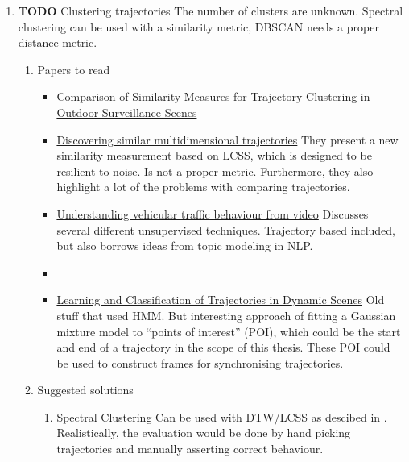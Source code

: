 \documentclass[11pt]{article}
\begin{document}
\begin{enumerate}
\item {\bfseries\sffamily TODO} Clustering trajectories
\label{sec:orgb6455f1}
The number of clusters are unknown. Spectral
clustering can be used with a similarity metric, DBSCAN needs a
proper distance metric.

\begin{enumerate}
\item Papers to read
\label{sec:org6747b9d}
\begin{itemize}
\item \href{https://ieeexplore.ieee.org/abstract/document/1699726}{Comparison of Similarity Measures for Trajectory Clustering in Outdoor Surveillance Scenes}

\item \href{https://ieeexplore.ieee.org/abstract/document/994784}{Discovering similar multidimensional trajectories}
They present a new similarity measurement based on LCSS, which
is designed to be resilient to noise. Is not a proper
metric. Furthermore, they also highlight a lot of the problems
with comparing trajectories.

\item \href{../../shared/modeling-motion-patterns/vehicular-traffic-behavior-from-video.pdf}{Understanding vehicular traffic behaviour from video}
Discusses several different unsupervised
techniques. Trajectory based included, but also borrows ideas
from topic modeling in NLP.

\item \cite{Kim2011Nov}

\item \href{../../shared/clustering-trajectories/learning-and-classification-of-trajectories-in-dynamic-scenes.pdf}{Learning and Classification of Trajectories in Dynamic Scenes}
Old stuff that used HMM. But interesting approach of fitting a
Gaussian mixture model to ``points of interest'' (POI), which could be
the start and end of a trajectory in the scope of this
thesis. These POI could be used to construct frames for
synchronising trajectories.
\end{itemize}

\item Suggested solutions
\label{sec:org85fc783}
\begin{enumerate}
\item Spectral Clustering
\label{sec:org955f3ab}
Can be used with DTW/LCSS as descibed in
\cite{Zhang2006Aug}. Realistically, the evaluation would be done by hand
picking trajectories and manually asserting correct behaviour.


\end{enumerate}
\end{enumerate}
\end{enumerate}
\end{document}
